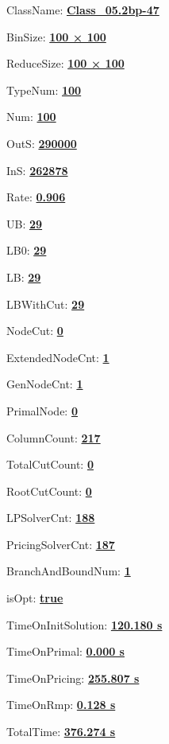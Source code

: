 \documentclass[11pt]{article}
\begin{document}
\pagestyle{empty}


ClassName: \underline{\textbf{Class_05.2bp-47}}
\par
BinSize: \underline{\textbf{100 × 100}}
\par
ReduceSize: \underline{\textbf{100 × 100}}
\par
TypeNum: \underline{\textbf{100}}
\par
Num: \underline{\textbf{100}}
\par
OutS: \underline{\textbf{290000}}
\par
InS: \underline{\textbf{262878}}
\par
Rate: \underline{\textbf{0.906}}
\par
UB: \underline{\textbf{29}}
\par
LB0: \underline{\textbf{29}}
\par
LB: \underline{\textbf{29}}
\par
LBWithCut: \underline{\textbf{29}}
\par
NodeCut: \underline{\textbf{0}}
\par
ExtendedNodeCnt: \underline{\textbf{1}}
\par
GenNodeCnt: \underline{\textbf{1}}
\par
PrimalNode: \underline{\textbf{0}}
\par
ColumnCount: \underline{\textbf{217}}
\par
TotalCutCount: \underline{\textbf{0}}
\par
RootCutCount: \underline{\textbf{0}}
\par
LPSolverCnt: \underline{\textbf{188}}
\par
PricingSolverCnt: \underline{\textbf{187}}
\par
BranchAndBoundNum: \underline{\textbf{1}}
\par
isOpt: \underline{\textbf{true}}
\par
TimeOnInitSolution: \underline{\textbf{120.180 s}}
\par
TimeOnPrimal: \underline{\textbf{0.000 s}}
\par
TimeOnPricing: \underline{\textbf{255.807 s}}
\par
TimeOnRmp: \underline{\textbf{0.128 s}}
\par
TotalTime: \underline{\textbf{376.274 s}}
\par
\newpage


\end{document}

